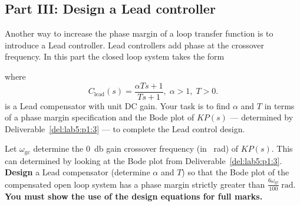 \subsection{Part III: Design a Lead controller}
Another way to increase the phase margin of a loop transfer function is to introduce a Lead controller.
Lead controllers add phase at the crossover frequency.
In this part the closed loop system takes the form
%
\begin{center}
\end{center}
%
where
\[
  C_\mathrm{lead}(s)
    =
      \frac{\alpha T s + 1}{T s + 1}
  ,
  \;
  \alpha > 1
  ,
  \;
  T > 0.
\]
is a Lead compensator with unit DC gain.
Your task is to find \(\alpha\) and \(T\) in terms of a phase margin specification and the Bode plot of \(K P(s)\) --- determined by Deliverable~\ref{del:lab5:p1:3} --- to complete the Lead control design.
%
\begin{deliverable}[label={del:lab5:p3:1}]
  Let \(\omega_\mathrm{gc}\) determine the \SI{0}{\decibel} gain crossover frequency (in \SI{}{\radian}) of \(K P(s).\) 
  This can determined by looking at the Bode plot from Deliverable~\ref{del:lab5:p1:3}.
  \textbf{Design} a Lead compensator (determine \(\alpha\) and \(T\)) so that the Bode plot of the compensated open loop system has a phase margin strictly greater than \(\frac{6\omega_\mathrm{gc}}{100}~\mathrm{rad}.\)
  \textbf{You must show the use of the design equations for full marks.}
\end{deliverable}
